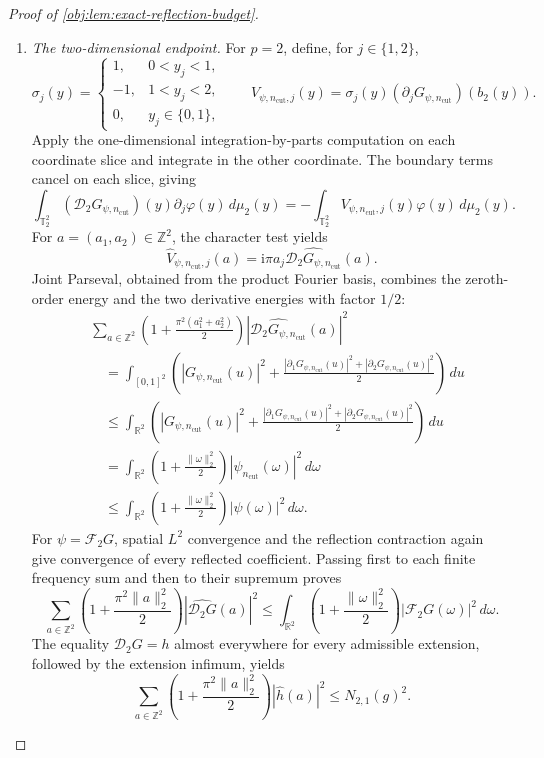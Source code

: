 \begin{proof}[Proof of \cref{obj:lem:exact-reflection-budget}]
\begin{enumerate}
\item \textit{The two-dimensional endpoint.}
For \(p=2\), define, for \(j\in\{1,2\}\),
\[
\sigma_j(y)=
\begin{cases}
1,&0<y_j<1,\\
-1,&1<y_j<2,\\
0,&y_j\in\{0,1\},
\end{cases}
\qquad
V_{\psi,n_{\mathrm{cut}},j}(y)
=
\sigma_j(y)
(\partial_jG_{\psi,n_{\mathrm{cut}}})(b_2(y)).
\]
Apply the one-dimensional integration-by-parts computation on each coordinate slice and integrate in the other coordinate. The boundary terms cancel on each slice, giving
\[
\int_{\mathbb T_2^2}
(\mathscr D_2G_{\psi,n_{\mathrm{cut}}})(y)
\partial_j\varphi(y)\,d\mu_2(y)
=
-\int_{\mathbb T_2^2}
V_{\psi,n_{\mathrm{cut}},j}(y)\varphi(y)\,d\mu_2(y).
\]
For \(a=(a_1,a_2)\in\mathbb Z^2\), the character test yields
\[
\widehat V_{\psi,n_{\mathrm{cut}},j}(a)
=
\mathrm i\pi a_j
\widehat{\mathscr D_2G_{\psi,n_{\mathrm{cut}}}}(a).
\]
Joint Parseval, obtained from the product Fourier basis, combines the zeroth-order energy and the two derivative energies with factor \(1/2\):
\[
\begin{aligned}
&\sum_{a\in\mathbb Z^2}
\left(1+\frac{\pi^2(a_1^2+a_2^2)}2\right)
\left|\widehat{\mathscr D_2G_{\psi,n_{\mathrm{cut}}}}(a)\right|^2\\
&\quad=
\int_{[0,1]^2}
\left(
|G_{\psi,n_{\mathrm{cut}}}(u)|^2+
\frac{
|\partial_1G_{\psi,n_{\mathrm{cut}}}(u)|^2+
|\partial_2G_{\psi,n_{\mathrm{cut}}}(u)|^2}{2}
\right)\,du\\
&\quad\leq
\int_{\mathbb R^2}
\left(
|G_{\psi,n_{\mathrm{cut}}}(u)|^2+
\frac{
|\partial_1G_{\psi,n_{\mathrm{cut}}}(u)|^2+
|\partial_2G_{\psi,n_{\mathrm{cut}}}(u)|^2}{2}
\right)\,du\\
&\quad=
\int_{\mathbb R^2}
\left(1+\frac{\|\omega\|_2^2}{2}\right)
|\psi_{n_{\mathrm{cut}}}(\omega)|^2\,d\omega\\
&\quad\leq
\int_{\mathbb R^2}
\left(1+\frac{\|\omega\|_2^2}{2}\right)|\psi(\omega)|^2\,d\omega.
\end{aligned}
\]
For \(\psi=\mathcal F_2G\), spatial \(L^2\) convergence and the reflection contraction again give convergence of every reflected coefficient. Passing first to each finite frequency sum and then to their supremum proves
\[
\sum_{a\in\mathbb Z^2}
\left(1+\frac{\pi^2\|a\|_2^2}{2}\right)
|\widehat{\mathscr D_2G}(a)|^2
\leq
\int_{\mathbb R^2}
\left(1+\frac{\|\omega\|_2^2}{2}\right)
|\mathcal F_2G(\omega)|^2\,d\omega.
\]
The equality \(\mathscr D_2G=h\) almost everywhere for every admissible extension, followed by the extension infimum, yields
\[
\sum_{a\in\mathbb Z^2}
\left(1+\frac{\pi^2\|a\|_2^2}{2}\right)|\widehat h(a)|^2
\leq N_{2,1}(g)^2.
\]


\end{enumerate}
\end{proof}
